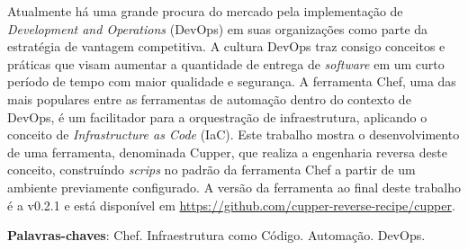 \begin{resumo}
  Atualmente há uma grande procura do mercado pela implementação de
  \textit{Development and Operations} (DevOps) em suas organizações como parte da estratégia de vantagem
  competitiva. A cultura DevOps traz consigo conceitos e práticas
  que visam aumentar a quantidade de entrega de \textit{software} em um
  curto período de tempo com maior qualidade e segurança. A
  ferramenta Chef, uma das mais populares entre as ferramentas de
  automação dentro do contexto de DevOps, é um facilitador para
  a orquestração de infraestrutura, aplicando o conceito de
  \textit{Infrastructure as Code} (IaC).
  Este trabalho mostra o desenvolvimento de uma ferramenta, denominada Cupper,
  que realiza a engenharia reversa deste conceito, construíndo \textit{scrips} no padrão da
  ferramenta Chef a partir de um ambiente previamente configurado.
  A versão da ferramenta ao final deste trabalho é a v0.2.1 e está disponível
  em \url{https://github.com/cupper-reverse-recipe/cupper}.

 \vspace{\onelineskip}
 \noindent
    \textbf{Palavras-chaves}: Chef. Infraestrutura como Código. Automação. DevOps.
\end{resumo}
